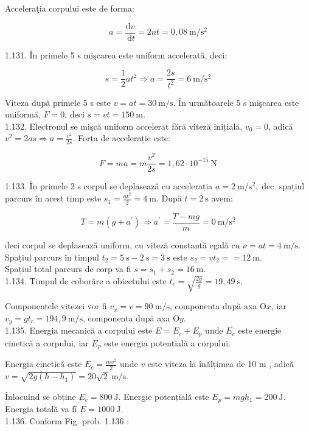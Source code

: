 \documentclass[10pt]{article}
\begin{document}
Acceleraţia corpului este de forma:

$$
a=\frac{\mathrm{d} v}{\mathrm{~d} t}=2 n t=0,08 \mathrm{~m} / \mathrm{s}^{2}
$$

1.131. În primele 5 s mişcarea este uniform accelerată, deci:

$$
s=\frac{1}{2} a t^{2} \Rightarrow a=\frac{2 s}{t^{2}}=6 \mathrm{~m} / \mathrm{s}^{2}
$$

Viteza după primele 5 s este $v=a t=30 \mathrm{~m} / \mathrm{s}$. În următoarele 5 s mişcarea este uniformă, $F=0$, deci $s=v t=150 \mathrm{~m}$.\\
1.132. Electronul se mişcă uniform accelerat fără viteză inițială, $v_{0}=0$, adică $v^{2}=2 a s \Rightarrow a=\frac{v^{2}}{2 s}$. Forța de accelerație este:

$$
F=m a=m \frac{v^{2}}{2 s}=1,62 \cdot 10^{-15} \mathrm{~N}
$$

1.133. În primele 2 s corpul se deplasează cu accelerația $a=2 \mathrm{~m} / \mathrm{s}^{2}, \operatorname{dec}$ spațiul parcurs în acest timp este $s_{1}=\frac{a t^{2}}{2}=4 \mathrm{~m}$. După $t=2 \mathrm{~s}$ avem:

$$
T=m\left(g+a^{\prime}\right) \Rightarrow a^{\prime}=\frac{T-m g}{m}=0 \mathrm{~m} / \mathrm{s}^{2}
$$

deci corpul se deplasează uniform, cu viteză constantă egală cu $\nu=a t=4 \mathrm{~m} / \mathrm{s}$.\\
Spațiul parcurs în timpul $t_{2}=5 \mathrm{~s}-2 \mathrm{~s}=3 \mathrm{~s}$ este $s_{2}=v t_{2}==12 \mathrm{~m}$.\\
Spațiul total parcurs de corp va fi $s=s_{1}+s_{2}=16 \mathrm{~m}$.\\
1.134. Timpul de coborâre a obiectului este $t_{c}=\sqrt{\frac{2 y}{g}}=19,49 \mathrm{~s}$.

Componentele vitezei vor fi $v_{x}=v=90 \mathrm{~m} / \mathrm{s}$, componenta după axa $\mathrm{O} x$, iar $v_{y}=g t_{c}=194,9 \mathrm{~m} / \mathrm{s}$, componenta după axa $\mathrm{O} y$.\\
1.135. Energia mecanică a corpului este $E=E_{c}+E_{p}$ unde $E_{c}$ este energie cinetică a corpului, iar $E_{p}$ este energia potentială a corpului.

Energia cinetică este $E_{c}=\frac{m v^{2}}{2}$ unde $v$ este viteza la înălțimea de 10 m , adică $v=\sqrt{2 g\left(h-h_{1}\right)}=20 \sqrt{2} \mathrm{~m} / \mathrm{s}$.

Înlocuind se obține $E_{c}=800 \mathrm{~J}$. Energie potențială este $E_{p}=m g h_{1}=200 \mathrm{~J}$.\\
Energia totală va fỉ $E=1000 \mathrm{~J}$.\\
1.136. Conform Fig. prob. 1.136 :
\end{document}

